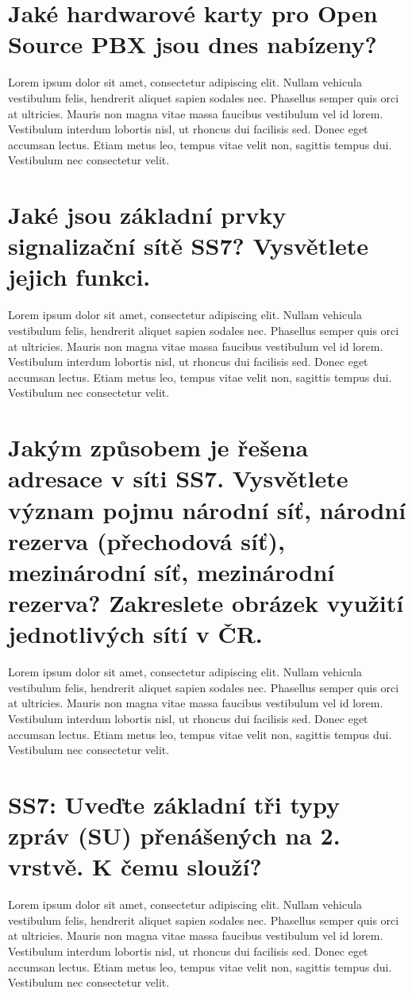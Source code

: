 \section{Jaké hardwarové karty pro Open Source PBX jsou dnes nabízeny?}
Lorem ipsum dolor sit amet, consectetur adipiscing elit. Nullam vehicula vestibulum felis, hendrerit aliquet sapien sodales nec. Phasellus semper quis orci at ultricies. Mauris non magna vitae massa faucibus vestibulum vel id lorem. Vestibulum interdum lobortis nisl, ut rhoncus dui facilisis sed. Donec eget accumsan lectus. Etiam metus leo, tempus vitae velit non, sagittis tempus dui. Vestibulum nec consectetur velit.

\section{Jaké jsou základní prvky signalizační sítě SS7? Vysvětlete jejich funkci.}
Lorem ipsum dolor sit amet, consectetur adipiscing elit. Nullam vehicula vestibulum felis, hendrerit aliquet sapien sodales nec. Phasellus semper quis orci at ultricies. Mauris non magna vitae massa faucibus vestibulum vel id lorem. Vestibulum interdum lobortis nisl, ut rhoncus dui facilisis sed. Donec eget accumsan lectus. Etiam metus leo, tempus vitae velit non, sagittis tempus dui. Vestibulum nec consectetur velit.

\section{Jakým způsobem je řešena adresace v síti SS7. Vysvětlete význam pojmu národní síť, národní rezerva (přechodová síť), mezinárodní síť, mezinárodní rezerva? Zakreslete obrázek využití jednotlivých sítí v ČR.}
Lorem ipsum dolor sit amet, consectetur adipiscing elit. Nullam vehicula vestibulum felis, hendrerit aliquet sapien sodales nec. Phasellus semper quis orci at ultricies. Mauris non magna vitae massa faucibus vestibulum vel id lorem. Vestibulum interdum lobortis nisl, ut rhoncus dui facilisis sed. Donec eget accumsan lectus. Etiam metus leo, tempus vitae velit non, sagittis tempus dui. Vestibulum nec consectetur velit.

\section{SS7: Uveďte základní tři typy zpráv (SU) přenášených na 2. vrstvě. K čemu slouží?}
Lorem ipsum dolor sit amet, consectetur adipiscing elit. Nullam vehicula vestibulum felis, hendrerit aliquet sapien sodales nec. Phasellus semper quis orci at ultricies. Mauris non magna vitae massa faucibus vestibulum vel id lorem. Vestibulum interdum lobortis nisl, ut rhoncus dui facilisis sed. Donec eget accumsan lectus. Etiam metus leo, tempus vitae velit non, sagittis tempus dui. Vestibulum nec consectetur velit.

